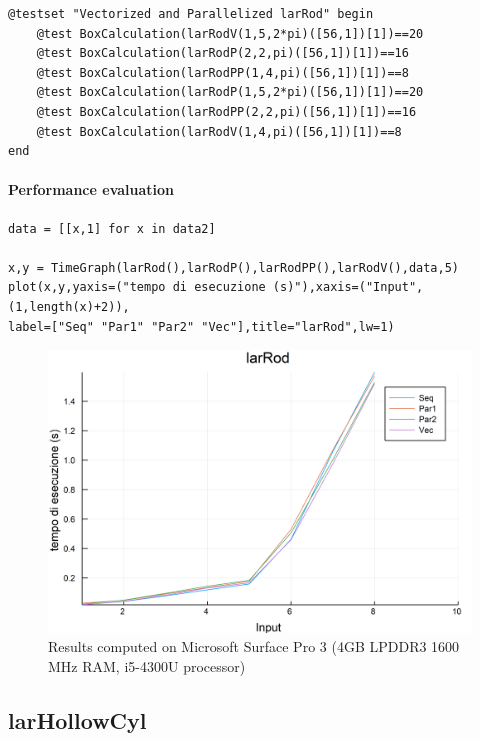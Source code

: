 \documentclass{article}
\begin{document}
\begin{Verbatim}
@testset "Vectorized and Parallelized larRod" begin
	@test BoxCalculation(larRodV(1,5,2*pi)([56,1])[1])==20
	@test BoxCalculation(larRodP(2,2,pi)([56,1])[1])==16
	@test BoxCalculation(larRodPP(1,4,pi)([56,1])[1])==8
	@test BoxCalculation(larRodP(1,5,2*pi)([56,1])[1])==20
	@test BoxCalculation(larRodPP(2,2,pi)([56,1])[1])==16
	@test BoxCalculation(larRodV(1,4,pi)([56,1])[1])==8
end
\end{Verbatim}

\paragraph{Performance evaluation}

\begin{Verbatim}
data = [[x,1] for x in data2]

x,y = TimeGraph(larRod(),larRodP(),larRodPP(),larRodV(),data,5)
plot(x,y,yaxis=("tempo di esecuzione (s)"),xaxis=("Input",(1,length(x)+2)),
label=["Seq" "Par1" "Par2" "Vec"],title="larRod",lw=1)

\end{Verbatim}

\begin{figure}[htbp] 
\centering 
\includegraphics[scale=.13]{larRodTime.png} 
\caption{Results computed on Microsoft Surface Pro  3 (4GB LPDDR3 1600 MHz RAM, i5-4300U processor)} 
\end{figure}
\subsection{larHollowCyl}
\end{document}

